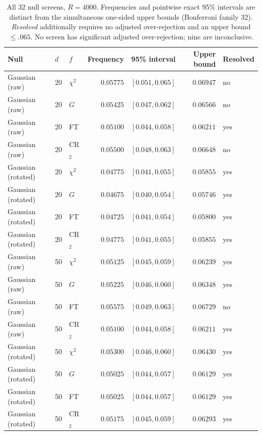 \begin{table}[t]
\caption{All 32 null screens, $R=4000$. Frequencies and pointwise exact 95\% intervals are distinct from the simultaneous one-sided upper bounds (Bonferroni family 32). \emph{Resolved} additionally requires no adjusted over-rejection and an upper bound $\le .065$. No screen has significant adjusted over-rejection; nine are inconclusive.}
\label{tab:matched-f-null}
\centering\small
\setlength{\tabcolsep}{8pt}\renewcommand{\arraystretch}{1.2}
\begin{tabular}{lllrrrl}
\toprule
Null & $d$ & $f$ & Frequency & 95\% interval & Upper bound & Resolved \\
\midrule
Gaussian (raw) & 20 & $\chi^2$ & $0.05775$ & $[0.051, 0.065]$ & $0.06947$ & no \\
Gaussian (raw) & 20 & $G$ & $0.05425$ & $[0.047, 0.062]$ & $0.06566$ & no \\
Gaussian (raw) & 20 & FT & $0.05100$ & $[0.044, 0.058]$ & $0.06211$ & yes \\
Gaussian (raw) & 20 & CR$_2$ & $0.05500$ & $[0.048, 0.063]$ & $0.06648$ & no \\
Gaussian (rotated) & 20 & $\chi^2$ & $0.04775$ & $[0.041, 0.055]$ & $0.05855$ & yes \\
Gaussian (rotated) & 20 & $G$ & $0.04675$ & $[0.040, 0.054]$ & $0.05746$ & yes \\
Gaussian (rotated) & 20 & FT & $0.04725$ & $[0.041, 0.054]$ & $0.05800$ & yes \\
Gaussian (rotated) & 20 & CR$_2$ & $0.04775$ & $[0.041, 0.055]$ & $0.05855$ & yes \\
Gaussian (raw) & 50 & $\chi^2$ & $0.05125$ & $[0.045, 0.059]$ & $0.06239$ & yes \\
Gaussian (raw) & 50 & $G$ & $0.05225$ & $[0.046, 0.060]$ & $0.06348$ & yes \\
Gaussian (raw) & 50 & FT & $0.05575$ & $[0.049, 0.063]$ & $0.06729$ & no \\
Gaussian (raw) & 50 & CR$_2$ & $0.05100$ & $[0.044, 0.058]$ & $0.06211$ & yes \\
Gaussian (rotated) & 50 & $\chi^2$ & $0.05300$ & $[0.046, 0.060]$ & $0.06430$ & yes \\
Gaussian (rotated) & 50 & $G$ & $0.05025$ & $[0.044, 0.057]$ & $0.06129$ & yes \\
Gaussian (rotated) & 50 & FT & $0.05025$ & $[0.044, 0.057]$ & $0.06129$ & yes \\
Gaussian (rotated) & 50 & CR$_2$ & $0.05175$ & $[0.045, 0.059]$ & $0.06293$ & yes \\

\end{tabular}
\end{table}
